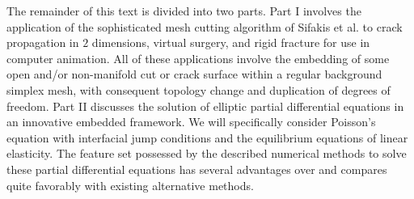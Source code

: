 The remainder of this text is divided into two parts. Part I involves the application of the sophisticated mesh cutting algorithm of Sifakis et al. \cite{Sifakis07} to crack propagation in $2$ dimensions, virtual surgery, and rigid fracture for use in computer animation. All of these applications involve the embedding of some open and/or non-manifold cut or crack surface within a regular background simplex mesh, with consequent topology change and duplication of degrees of freedom. Part II discusses the solution of elliptic partial differential equations in an innovative embedded framework. We will specifically consider Poisson's equation with interfacial jump conditions and the equilibrium equations of linear elasticity. The feature set possessed by the described numerical methods to solve these partial differential equations has several advantages over and compares quite favorably with existing alternative methods.
